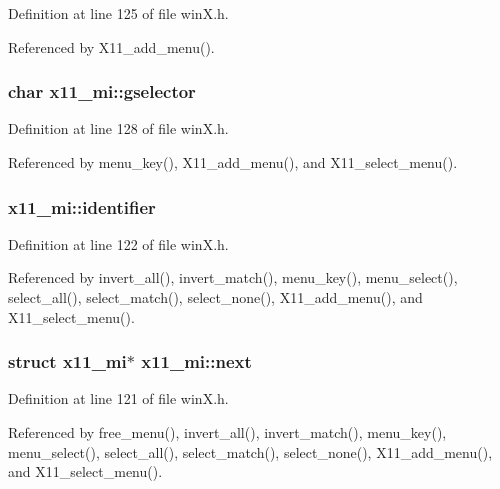 Definition at line 125 of file win\+X.\+h.



Referenced by X11\+\_\+add\+\_\+menu().

\hypertarget{structx11__mi_a5b55248468ee6afbab99a22e5faacfe9}{
\subsubsection[{gselector}]{\setlength{\rightskip}{0pt plus 5cm}char x11\+\_\+mi\+::gselector}}\label{structx11__mi_a5b55248468ee6afbab99a22e5faacfe9}


Definition at line 128 of file win\+X.\+h.



Referenced by menu\+\_\+key(), X11\+\_\+add\+\_\+menu(), and X11\+\_\+select\+\_\+menu().

\hypertarget{structx11__mi_a80d53847aac61da4300f9fd5690b97f7}{
\subsubsection[{identifier}]{ x11\+\_\+mi\+::identifier}}\label{structx11__mi_a80d53847aac61da4300f9fd5690b97f7}


Definition at line 122 of file win\+X.\+h.



Referenced by invert\+\_\+all(), invert\+\_\+match(), menu\+\_\+key(), menu\+\_\+select(), select\+\_\+all(), select\+\_\+match(), select\+\_\+none(), X11\+\_\+add\+\_\+menu(), and X11\+\_\+select\+\_\+menu().

\hypertarget{structx11__mi_a30ef44cd1db7f059c3ea38ff354ca3c7}{
\subsubsection[{next}]{\setlength{\rightskip}{0pt plus 5cm}struct {\bf x11\+\_\+mi}$\ast$ x11\+\_\+mi\+::next}}\label{structx11__mi_a30ef44cd1db7f059c3ea38ff354ca3c7}


Definition at line 121 of file win\+X.\+h.



Referenced by free\+\_\+menu(), invert\+\_\+all(), invert\+\_\+match(), menu\+\_\+key(), menu\+\_\+select(), select\+\_\+all(), select\+\_\+match(), select\+\_\+none(), X11\+\_\+add\+\_\+menu(), and X11\+\_\+select\+\_\+menu().

